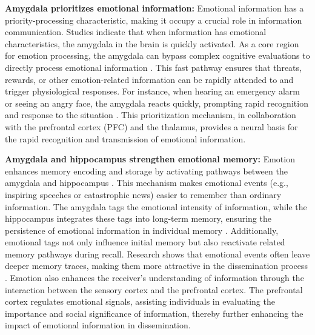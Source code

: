 \textbf{Amygdala prioritizes emotional information:} Emotional information has a priority-processing characteristic, making it occupy a crucial role in information communication. Studies indicate that when information has emotional characteristics, the amygdala in the brain is quickly activated. As a core region for emotion processing, the amygdala can bypass complex cognitive evaluations to directly process emotional information \cite{ledoux2000emotion}. This fast pathway ensures that threats, rewards, or other emotion-related information can be rapidly attended to and trigger physiological responses. For instance, when hearing an emergency alarm or seeing an angry face, the amygdala reacts quickly, prompting rapid recognition and response to the situation \cite{phelps2004human}. This prioritization mechanism, in collaboration with the prefrontal cortex (PFC) and the thalamus, provides a neural basis for the rapid recognition and transmission of emotional information.

\textbf{Amygdala and hippocampus strengthen emotional memory: }Emotion enhances memory encoding and storage by activating pathways between the amygdala and hippocampus \cite{cahill1998mechanisms}. This mechanism makes emotional events (e.g., inspiring speeches or catastrophic news) easier to remember than ordinary information. The amygdala tags the emotional intensity of information, while the hippocampus integrates these tags into long-term memory, ensuring the persistence of emotional information in individual memory \cite{phelps2004human}. Additionally, emotional tags not only influence initial memory but also reactivate related memory pathways during recall. Research shows that emotional events often leave deeper memory traces, making them more attractive in the dissemination process \cite{sakaki2014emotion}. Emotion also enhances the receiver’s understanding of information through the interaction between the sensory cortex and the prefrontal cortex.	The prefrontal cortex regulates emotional signals, assisting individuals in evaluating the importance and social significance of information, thereby further enhancing the impact of emotional information in dissemination.	

